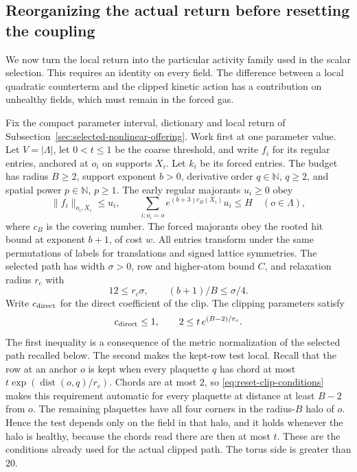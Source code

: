 \subsection{Reorganizing the actual return before resetting the coupling}
\label{sec:physical-reset-reorganization}
We now turn the local return into the particular activity family used
in the scalar selection. This requires an identity on every field.
The difference between a local quadratic counterterm and the clipped
kinetic action has a contribution on unhealthy fields, which must
remain in the forced gas.

Fix the compact parameter interval, dictionary and local return of
Subsection~\ref{sec:selected-nonlinear-offering}. Work first at one
parameter value. Let $V=|\Lambda|$, let $0<t\le1$ be the coarse
threshold, and write $f_i$ for its regular entries, anchored at $o_i$
on supports $X_i$. Let $k_i$ be its forced entries. The budget has
radius $B\ge2$, support exponent $b>0$, derivative order $q\in\mathbb N$, $q\ge2$,
and spatial power $p\in\mathbb N$, $p\ge1$. The early regular majorants $u_i\ge0$ obey
\begin{equation}\label{eq:reset-early-majorant}
 \|f_i\|_{o_i,X_i}\le u_i,\qquad
 \sum_{i:o_i=o}e^{(b+3)c_B(X_i)}u_i\le H
                         \quad(o\in\Lambda),
\end{equation}
where $c_B$ is the covering number. The forced majorants obey the
rooted hit bound at exponent $b+1$, of cost $w$. All entries transform
under the same permutations of labels for translations and signed
lattice symmetries. The selected path has width $\sigma>0$, row and
higher-atom bound $C$, and relaxation radius $r_c$ with
\[
             12\le r_c\sigma,\qquad (b+1)/B\le\sigma/4.
\]
Write $c_{\rm direct}$ for the direct coefficient of the clip. The
clipping parameters satisfy
\begin{equation}\label{eq:reset-clip-conditions}
 c_{\rm direct}\le1,\qquad 2\le t\,e^{(B-2)/r_c}.
\end{equation}
The first inequality is a consequence of the metric normalization
of the selected path recalled below. The second makes the kept-row
test local. Recall that the row at an anchor $o$ is kept when every
plaquette $q$ has chord at most
$t\exp(\operatorname{dist}(o,q)/r_c)$. Chords are at most $2$, so
\eqref{eq:reset-clip-conditions} makes this requirement automatic
for every plaquette at distance at least $B-2$ from $o$. The
remaining plaquettes have all four corners in the radius-$B$ halo of
$o$. Hence the test depends only on the field in that halo, and it
holds whenever the halo is healthy, because the chords read there are
then at most $t$. These are the conditions already used for the
actual clipped path. The torus side is greater than $20$.

